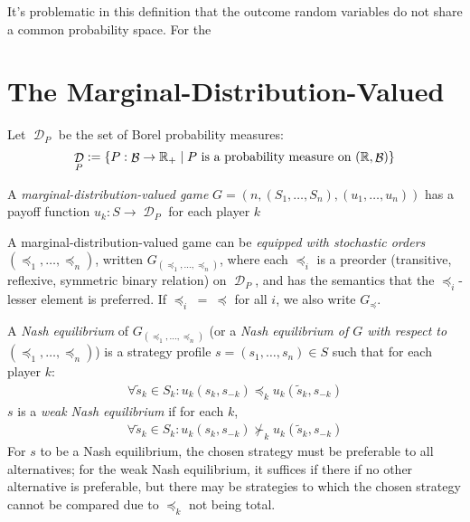 \documentclass[a4paper]{scrreprt}
\DeclareMathOperator{\D}{\mathcal{D}}
\DeclareMathOperator{\B}{\mathcal{B}}
\DeclareMathOperator{\releq}{\;=\;}
\begin{document}
    It's problematic in this definition that the outcome random variables do not share a common probability space.
    For the 



    \section{The Marginal-Distribution-Valued}
    \label{sec:marginalDistributionValued}
    Let $\D_P$ be the set of Borel probability measures:    
    \[ \D_P := \set{P: \B \to \R_+ \mid P \text{ is a probability measure on } (\R, \B)} \]
    
    \begin{defn}
        A \emph{marginal-distribution-valued game} $G = (n, (S_1, \dots, S_n), (u_1, \dots, u_n))$ has a payoff function $u_k: S \to \D_P$ for each player $k$
    
        A marginal-distribution-valued game can be \emph{equipped with stochastic orders} $(\preccurlyeq_1, \dots, \preccurlyeq_n)$, written $G_{(\preccurlyeq_1, \dots, \preccurlyeq_n)}$, where each $\preccurlyeq_i$ is a preorder (transitive, reflexive, symmetric binary relation) on $\D_P$,
        and has the semantics that the $\preccurlyeq_i$-lesser element is preferred.
        If $\preccurlyeq_i \releq \preccurlyeq$ for all $i$, we also write $G_\preccurlyeq$.
    \end{defn}
    
    \begin{defn}
        A \emph{Nash equilibrium} of $G_{(\preccurlyeq_1, \dots, \preccurlyeq_n)}$ (or a \emph{Nash equilibrium of $G$ with respect to $(\preccurlyeq_1, \dots, \preccurlyeq_n)$})
        is a strategy profile $s = (s_1, \dots, s_n) \in S$ such that for each player $k$:
        \begin{gather}
            \forall \tilde{s}_k \in S_k: u_k(s_k, s_{-k}) \preccurlyeq_k u_k(\tilde{s}_k, s_{-k})
        \end{gather}
        $s$ is a 
        \emph{weak Nash equilibrium} if for each $k$,
        \begin{gather}
            \forall \tilde{s}_k \in S_k: u_k(s_k, s_{-k}) \nsucc_k u_k(\tilde{s}_k, s_{-k})
        \end{gather}
        For $s$ to be a Nash equilibrium, the chosen strategy must be preferable to all alternatives; for the weak Nash equilibrium, it suffices if there if no other alternative is preferable, but there may be strategies to which the chosen strategy cannot be compared due to $\preccurlyeq_k$ not being total. 
    \end{defn}
    
\end{document}
